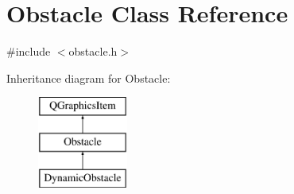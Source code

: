 \hypertarget{class_obstacle}{}\section{Obstacle Class Reference}
\label{class_obstacle}


{\ttfamily \#include $<$obstacle.\+h$>$}

Inheritance diagram for Obstacle\+:\begin{figure}[H]
\begin{center}
\leavevmode
\includegraphics[height=3.000000cm]{class_obstacle}
\end{center}
\end{figure}
